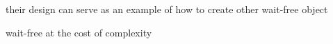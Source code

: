 their design can serve as an example of how to create other wait-free object

wait-free at the cost of complexity
